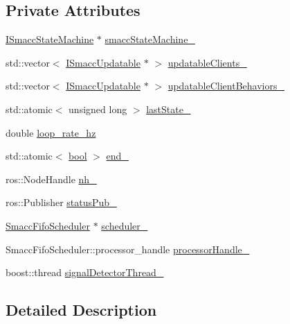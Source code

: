 \subsection*{Private Attributes}
\begin{DoxyCompactItemize}
\item 
\hyperlink{classsmacc_1_1ISmaccStateMachine}{I\+Smacc\+State\+Machine} $\ast$ \hyperlink{classsmacc_1_1SignalDetector_a46025de6ac7b5980e22144f9703236a4}{smacc\+State\+Machine\+\_\+}
\item 
std\+::vector$<$ \hyperlink{classsmacc_1_1ISmaccUpdatable}{I\+Smacc\+Updatable} $\ast$ $>$ \hyperlink{classsmacc_1_1SignalDetector_a01a457b4ec935473d6426efb7b87e683}{updatable\+Clients\+\_\+}
\item 
std\+::vector$<$ \hyperlink{classsmacc_1_1ISmaccUpdatable}{I\+Smacc\+Updatable} $\ast$ $>$ \hyperlink{classsmacc_1_1SignalDetector_a9dce129da8c8a9971416a8f498132c23}{updatable\+Client\+Behaviors\+\_\+}
\item 
std\+::atomic$<$ unsigned long $>$ \hyperlink{classsmacc_1_1SignalDetector_a72293ed0e98f4200fbe75b53f1e41eab}{last\+State\+\_\+}
\item 
double \hyperlink{classsmacc_1_1SignalDetector_a41a2ae4262ed350f46d8b886bdc1dfa5}{loop\+\_\+rate\+\_\+hz}
\item 
std\+::atomic$<$ \hyperlink{classbool}{bool} $>$ \hyperlink{classsmacc_1_1SignalDetector_aaee266393c01693528a2d74b1f2354a2}{end\+\_\+}
\item 
ros\+::\+Node\+Handle \hyperlink{classsmacc_1_1SignalDetector_a5c416677fd537afc79f2fbc2e68b2dee}{nh\+\_\+}
\item 
ros\+::\+Publisher \hyperlink{classsmacc_1_1SignalDetector_ae065bbd4e699e5fce00fbc508dedd4c1}{status\+Pub\+\_\+}
\item 
\hyperlink{smacc__fifo__scheduler_8h_a0063e275231c80d5f97df21d17257bf7}{Smacc\+Fifo\+Scheduler} $\ast$ \hyperlink{classsmacc_1_1SignalDetector_adaee5b9b91d0e6305dc1ab30f7ab566d}{scheduler\+\_\+}
\item 
Smacc\+Fifo\+Scheduler\+::processor\+\_\+handle \hyperlink{classsmacc_1_1SignalDetector_a9a77dc9f0e9f8f56dff5e76077abcb78}{processor\+Handle\+\_\+}
\item 
boost\+::thread \hyperlink{classsmacc_1_1SignalDetector_a4346a400cd37eafc5d1d2e63d975785e}{signal\+Detector\+Thread\+\_\+}
\end{DoxyCompactItemize}


\subsection{Detailed Description}


